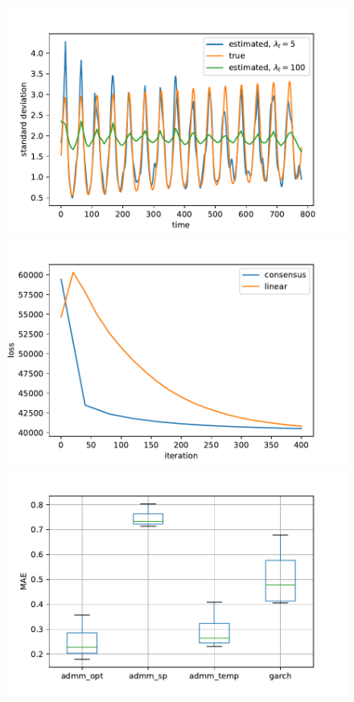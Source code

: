\documentclass[letterpaper]{article} %
\begin{document}
\begin{figure}[tb]
  \centering	
  \includegraphics[height=.12\textheight]{Figures/true_fitted_var}
  \includegraphics[height=.12\textheight]{Figures/convergence}  
  \includegraphics[height=.12\textheight]{Figures/modelComp_MAE}  

\end{figure}
\end{document}
